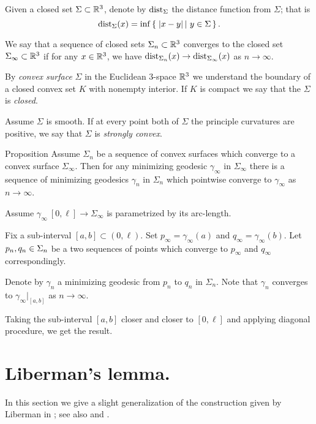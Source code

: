 \documentclass[a4paper,10pt]{amsart}
\begin{document}
Given a closed set $\Sigma\subset \mathbb{R}^3$,
denote by $\operatorname{dist}_\Sigma$ the distance function from $\Sigma$;
that is 
\[\dist_\Sigma(x)=\inf\set{|x-y|}{y\in\Sigma}.\]

We say that a sequence of closed sets $\Sigma_n\subset \mathbb{R}^3$
converges to the closed set $\Sigma_\infty\subset \mathbb{R}^3$ 
if for any $x\in\mathbb{R}^3$,
we have
$\operatorname{dist}_{\Sigma_n}(x)\to\operatorname{dist}_{\Sigma_\infty}(x)$ as $n\to\infty$.


By \emph{convex surface} $\Sigma$ in the Euclidean 3-space $\mathbb{R}^3$ we understand the boundary of a closed convex set $K$ with nonempty interior.
If $K$ is compact we say that the $\Sigma$ is \emph{closed}.

Assume $\Sigma$ is smooth.
If at every point both of $\Sigma$
the principle curvatures are positive, 
we say that $\Sigma$ is \emph{strongly convex}. 

\begin{thm}{Proposition}\label{prop:convegence}
Assume $\Sigma_n$ be a sequence of convex surfaces which converge to a convex surface $\Sigma_\infty$.
Then for any minimizing geodesic $\gamma_\infty$ in $\Sigma_\infty$ there is a sequence of minimizing geodesics $\gamma_n$ in $\Sigma_n$ which pointwise converge to $\gamma_\infty$ as $n\to \infty$.
\end{thm}

Assume $\gamma_\infty\:[0,\ell]\to\Sigma_\infty$ is parametrized by its arc-length.

Fix a sub-interval $[a,b]\subset (0,\ell)$.
Set $p_\infty=\gamma_\infty(a)$ and $q_\infty=\gamma_\infty(b)$.
Let $p_n,q_n\zz\in\Sigma_n$ be a two sequences of points which converge to $p_\infty$ and $q_\infty$ 
correspondingly.

Denote by $\gamma_n$ a minimizing geodesic from $p_n$ to $q_n$ in $\Sigma_n$.
Note that $\gamma_n$ converges to $\gamma_\infty|_{[a,b]}$
as $n\to\infty$.

Taking the sub-interval  $[a,b]$ closer and closer to $[0,\ell]$
and applying diagonal procedure, we get the result.
\qeds

\section{Liberman's lemma.}

In this section we give a slight generalization 
of the construction given by Liberman in \cite{liberman};
see also \cite{milka-liberman} and \cite{petrunin}.
\end{document}
